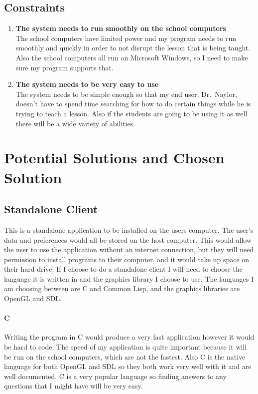 \subsection{Constraints}
\begin{enumerate}
\setcounter{enumi}{\thetmpc}
	\item{\bf The system needs to run smoothly on the school computers}
		\hfill \\
		The school computers have limited power and my program needs to
		run smoothly and quickly in order to not disrupt the lesson that
		is being taught. Also the school computers all run on Microsoft
		Windows, so I need to make sure my program supports that. 
	\item{\bf The system needs to be very easy to use} \hfill \\
		The system needs to be simple enough so that my end user,
		Dr.~Naylor, doesn't have to spend time searching for how to do
		certain things while he is trying to teach a lesson. Also if the
		students are going to be using it as well there will be a wide
		variety of abilities.
\end{enumerate}

\section{Potential Solutions and Chosen Solution}

\subsection{Standalone Client}
This is a standalone application to be installed on the users computer. The
user's data and preferences would all be stored on the host computer. This would
allow the user to use the application without an internet connection, but they
will need permission to install programs to their computer, and it would take up
space on their hard drive. If I choose to do a standalone client I will need to
choose the language it is written in and the graphics library I choose to use.
The languages I am choosing between are C and Common Lisp, and the graphics
libraries are OpenGL and SDL.

\paragraph{C}
Writing the program in C would produce a very fast application however it would
be hard to code. The speed of my application is quite important because it will
be run on the school computers, which are not the fastest. Also C is the native
language for both OpenGL and SDL so they both work very well with it and are
well documented. C is a very popular language so finding answers to any
questions that I might have will be very easy.

